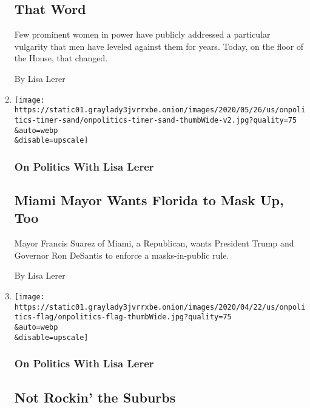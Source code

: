 \begin{enumerate}
  \hypertarget{that-word}{%
  \subsection{That Word}\label{that-word}}

  Few prominent women in power have publicly addressed a particular
  vulgarity that men have leveled against them for years. Today, on the
  floor of the House, that changed.

  By Lisa Lerer
\item
  \href{/2020/07/22/us/politics/miami-mayor-francis-suarez-masks.html}{}

  \texttt{[image: https://static01.graylady3jvrrxbe.onion/images/2020/05/26/us/onpolitics-timer-sand/onpolitics-timer-sand-thumbWide-v2.jpg?quality=75\\\&auto=webp\\\&disable=upscale]}

  \hypertarget{on-politics-with-lisa-lerer-4}{%
  \subsubsection{On Politics With Lisa
  Lerer}\label{on-politics-with-lisa-lerer-4}}

  \hypertarget{miami-mayor-wants-florida-to-mask-up-too}{%
  \subsection{Miami Mayor Wants Florida to Mask Up,
  Too}\label{miami-mayor-wants-florida-to-mask-up-too}}

  Mayor Francis Suarez of Miami, a Republican, wants President Trump and
  Governor Ron DeSantis to enforce a masks-in-public rule.

  By Lisa Lerer
\item
  \href{/2020/07/20/us/politics/trump-suburbs.html}{}

  \texttt{[image: https://static01.graylady3jvrrxbe.onion/images/2020/04/22/us/onpolitics-flag/onpolitics-flag-thumbWide.jpg?quality=75\\\&auto=webp\\\&disable=upscale]}

  \hypertarget{on-politics-with-lisa-lerer-5}{%
  \subsubsection{On Politics With Lisa
  Lerer}\label{on-politics-with-lisa-lerer-5}}

  \hypertarget{not-rockin-the-suburbs}{%
  \subsection{Not Rockin' the Suburbs}\label{not-rockin-the-suburbs}}


\end{enumerate}
